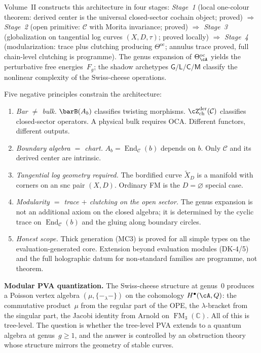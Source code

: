 Volume~II constructs this architecture in four stages:
\emph{Stage~1} (local one-colour theorem: derived center is the
universal closed-sector cochain object; proved) $\Rightarrow$
\emph{Stage~2} (open primitive: $\mathcal C$ with Morita invariance;
proved) $\Rightarrow$
\emph{Stage~3} (globalization on tangential log curves
$(X,D,\tau)$; proved locally) $\Rightarrow$
\emph{Stage~4} (modularization: trace plus clutching producing
$\Theta^{\mathrm{oc}}$; annulus trace proved, full chain-level clutching
is programme).
The genus expansion of $\Theta^{\mathrm{oc}}_\cA$ yields the
perturbative free energies~$F_g$; the shadow archetypes
$\mathsf{G}/\mathsf{L}/\mathsf{C}/\mathsf{M}$ classify the nonlinear
complexity of the Swiss-cheese operations.

Five negative principles constrain the architecture:
\begin{enumerate}[label=\textup{N\arabic*.},nosep]
\item \emph{Bar $\neq$ bulk.}
 $\barB(A_b)$ classifies twisting morphisms.
 $\cZ^{\mathrm{der}}_{\mathrm{ch}}(\mathcal C)$ classifies
 closed-sector operators. A physical bulk requires OCA. Different
 functors, different outputs.
\item \emph{Boundary algebra $=$ chart.}
 $A_b = \operatorname{End}_{\mathcal C}(b)$ depends on $b$. Only
 $\mathcal C$ and its derived center are intrinsic.
\item \emph{Tangential log geometry required.}
 The bordified curve $\widetilde{X}_D$ is a manifold with corners
 on an snc pair $(X,D)$. Ordinary FM is the $D = \varnothing$
 special case.
\item \emph{Modularity $=$ trace $+$ clutching on the open sector.}
 The genus expansion is not an additional axiom on the closed
 algebra; it is determined by the cyclic trace on
 $\operatorname{End}_{\mathcal C}(b)$ and the gluing along
 boundary circles.
\item \emph{Honest scope.}
 Thick generation (MC3) is proved for all simple types on the
 evaluation-generated core. Extension beyond evaluation modules
 (DK-4/5) and the full holographic datum for non-standard families
 are programme, not theorem.
\end{enumerate}

\bigskip

\noindent\textbf{Modular PVA quantization.}
The Swiss-cheese structure at genus~$0$ produces a Poisson vertex
algebra $(\mu,\{-_\lambda-\})$ on the cohomology $H^\bullet(\cA,Q)$:
the commutative product~$\mu$ from the regular part of the OPE, the
$\lambda$-bracket from the singular part, the Jacobi identity from
Arnold on $\operatorname{FM}_3(\mathbb C)$. All of this is tree-level.
The question is whether the tree-level PVA extends to a quantum
algebra at genus~$g\ge 1$, and the answer is controlled by an
obstruction theory whose structure mirrors the geometry of stable
curves.

